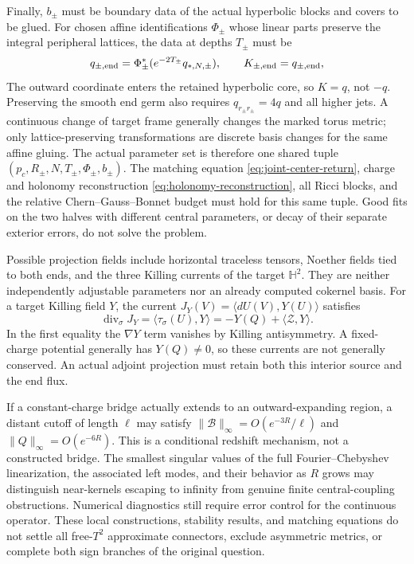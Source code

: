 \documentclass[a4paper,11pt]{article}
\numberwithin{equation}{section}
\theoremstyle{definition}
\begin{document}
Finally, $b_\pm$ must be boundary data of the actual hyperbolic blocks and covers to be glued.
For chosen affine identifications $\Phi_\pm$ whose linear parts preserve the integral peripheral lattices, the data at depths $T_\pm$ must be
\begin{equation}\label{eq:affine-end-data}
 q_{\pm,\rm end}
 =\Phi_\pm^*(e^{-2T_\pm}q_{*,N,\pm}),\qquad
 K_{\pm,\rm end}=q_{\pm,\rm end},
\end{equation}
The outward coordinate enters the retained hyperbolic core, so $K=q$, not $-q$.
Preserving the smooth end germ also requires $q_{r_\pm r_\pm}=4q$ and all higher jets.
A continuous change of target frame generally changes the marked torus metric; only lattice-preserving transformations are discrete basis changes for the same affine gluing.
The actual parameter set is therefore one shared tuple
$(p_c,R_\pm,N,T_\pm,\Phi_\pm,b_\pm)$.
The matching equation \eqref{eq:joint-center-return}, charge and holonomy reconstruction \eqref{eq:holonomy-reconstruction}, all Ricci blocks, and the relative Chern--Gauss--Bonnet budget must hold for this same tuple.
Good fits on the two halves with different central parameters, or decay of their separate exterior errors, do not solve the problem.

Possible projection fields include horizontal traceless tensors, Noether fields tied to both ends, and the three Killing currents of the target $\mathbb H^2$.
They are neither independently adjustable parameters nor an already computed cokernel basis.
For a target Killing field $Y$, the current $J_Y(V)=\langle dU(V),Y(U)\rangle$ satisfies
\[
 \operatorname{div}_\sigma J_Y
 =\langle\tau_\sigma(U),Y\rangle
 =-Y(Q)+\langle\mathscr Z,Y\rangle.
\]
In the first equality the $\nabla Y$ term vanishes by Killing antisymmetry.
A fixed-charge potential generally has $Y(Q)\ne0$, so these currents are not generally conserved.
An actual adjoint projection must retain both this interior source and the end flux.

If a constant-charge bridge actually extends to an outward-expanding region, a distant cutoff of length $\ell$ may satisfy
$\|\mathscr B\|_\infty=O(e^{-3R}/\ell)$ and $\|Q\|_\infty=O(e^{-6R})$.
This is a conditional redshift mechanism, not a constructed bridge.
The smallest singular values of the full Fourier--Chebyshev linearization, the associated left modes, and their behavior as $R$ grows may distinguish near-kernels escaping to infinity from genuine finite central-coupling obstructions.
Numerical diagnostics still require error control for the continuous operator.
These local constructions, stability results, and matching equations do not settle all free-$T^2$ approximate connectors, exclude asymmetric metrics, or complete both sign branches of the original question.
\end{document}
